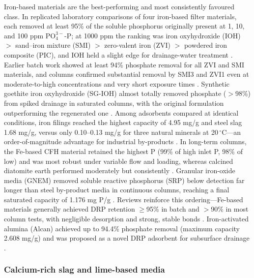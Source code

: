 \documentclass[11pt]{article}
\begin{document}
Iron-based materials are the best-performing and most consistently favoured class. In replicated laboratory comparisons of four iron-based filter materials, each removed at least 95\% of the soluble phosphorus originally present at 1, 10, and 100 ppm $\mathrm{PO_4^{3-}}$-P; at 1000 ppm the ranking was iron oxyhydroxide (IOH) $>$ sand--iron mixture (SMI) $>$ zero-valent iron (ZVI) $>$ powdered iron composite (PIC), and IOH held a slight edge for drainage-water treatment \parencite{Allred2014}. Earlier batch work showed at least 94\% phosphate removal for all ZVI and SMI materials, and columns confirmed substantial removal by SMI3 and ZVI1 even at moderate-to-high concentrations and very short exposure times \parencite{Allred2012}. Synthetic goethite iron oxyhydroxide (SG-IOH) almost totally removed phosphate ($>$98\%) from spiked drainage in saturated columns, with the original formulation outperforming the regenerated one \parencite{Allred2017}. Among adsorbents compared at identical conditions, iron filings reached the highest capacity of 4.95 mg/g and steel slag 1.68 mg/g, versus only 0.10--0.13 mg/g for three natural minerals at 20\,$^{\circ}$C---an order-of-magnitude advantage for industrial by-products \parencite{Sellner2019b}. In long-term columns, the Fe-based CFH material retained the highest P (99\% of high inlet P, 98\% of low) and was most robust under variable flow and loading, whereas calcined diatomite earth performed moderately but consistently \parencite{Pugliese2023}. Granular iron-oxide media (GNEM) removed soluble reactive phosphorus (SRP) below detection far longer than steel by-product media in continuous columns, reaching a final saturated capacity of 1.176 mg P/g \parencite{Hauda2020}. Reviews reinforce this ordering---Fe-based materials generally achieved DRP retention $\geq$95\% in batch and $>$90\% in most column tests, with negligible desorption and strong, stable bonds \parencite{Mendes2022}. Iron-activated alumina (Alcan) achieved up to 94.4\% phosphate removal (maximum capacity 2.608 mg/g) and was proposed as a novel DRP adsorbent for subsurface drainage \parencite{Kumari2025}.

\subsubsection{Calcium-rich slag and lime-based media}
\end{document}
